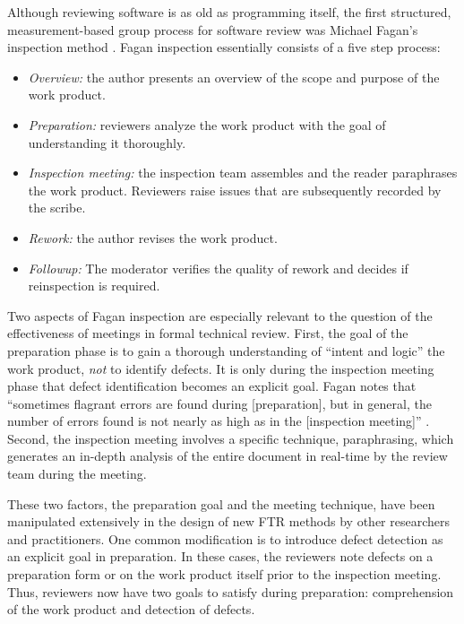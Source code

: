 Although reviewing software is as old as programming itself, the first
structured, measurement-based group process for software review was
Michael Fagan's inspection method \cite{Fagan76}. Fagan
inspection essentially consists of a five step process:

\begin{itemize}
\item {\em Overview:} the author presents an overview of the scope and
purpose of the work product.

\item {\em Preparation:} reviewers analyze the work product with the goal
of understanding it thoroughly. 

\item {\em Inspection meeting:} the inspection team assembles and the 
reader paraphrases the work product. Reviewers raise issues that are 
subsequently recorded by the scribe. 

\item {\em Rework:} the author revises the work product. 

\item {\em Followup:} The moderator verifies the quality of rework and 
decides if reinspection is required. 

\end{itemize}

Two aspects of Fagan inspection are especially relevant to the question of
the effectiveness of meetings in formal technical review. First, the goal
of the preparation phase is to gain a thorough understanding of ``intent
and logic'' the work product, {\em not} to identify defects. It is only
during the inspection meeting phase that defect identification becomes an
explicit goal.  Fagan notes that ``sometimes flagrant errors are found
during [preparation], but in general, the number of errors found is not
nearly as high as in the [inspection meeting]'' \cite{Fagan76}.  Second,
the inspection meeting involves a specific technique, paraphrasing, which
generates an in-depth analysis of the entire document in real-time by the
review team during the meeting.

These two factors, the preparation goal and the meeting technique, have
been manipulated extensively in the design of new FTR methods by other
researchers and practitioners.  One common modification is to introduce
defect detection as an explicit goal in preparation. In these cases, the
reviewers note defects on a preparation form or on the work product itself
prior to the inspection meeting. Thus, reviewers now have two goals to
satisfy during preparation: comprehension of the work product and detection
of defects.

